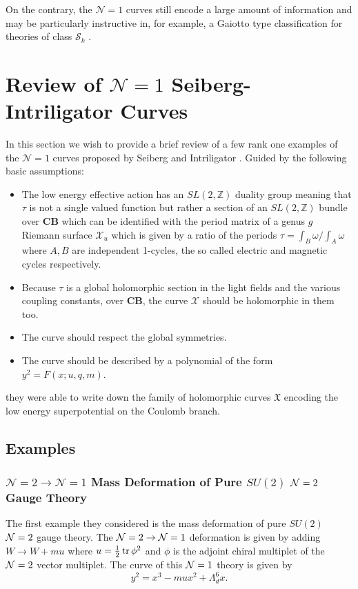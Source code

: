 \documentclass[main.tex]{subfiles}
\begin{document}
On the contrary, the $\mathcal{N}=1$ curves still encode a large amount of information and may be particularly instructive in, for example, a Gaiotto type classification for theories of class $\mathcal{S}_k$ \cite{Gaiotto:2009we,Gaiotto:2009hg}.

\section{Review of \texorpdfstring{$\mathcal{N}=1$}{N=1} Seiberg-Intriligator Curves}
In this section we wish to provide a brief review of a few rank one examples of the $\mathcal{N}=1$ curves proposed by Seiberg and Intriligator \cite{Intriligator:1994sm}. Guided by the following basic assumptions:
\begin{itemize}
 \item {The low energy effective action has an $SL(2,\mathbb{Z})$ duality group meaning that $\tau$ is not a single valued function but rather a section of an $SL(2,\mathbb{Z})$ bundle over $\mathbf{CB}$ which can be identified with the period matrix of a genus $g$ Riemann surface $\mathcal{X}_u$ which is given by a ratio of the periods $\tau=\int_{B}\omega/\int_{A}\omega$ where $A,B$ are independent 1-cycles, the so called electric and magnetic cycles respectively.}
 \item {Because $\tau$ is a global holomorphic section in the light fields and the various coupling constants, over $\mathbf{CB}$, the curve $\mathcal{X}$ should be holomorphic in them too.}
\item{The curve should respect the global symmetries.}
\item{The curve should be described by a polynomial of the form $y^2=F(x;u,q,m)$.}
\end{itemize}
they were able to write down the family of holomorphic curves $\mathfrak{X}$ encoding the low energy superpotential on the Coulomb branch.
\subsection{Examples}
\subsubsection{$\mathcal{N}=2\to\mathcal{N}=1$ Mass Deformation of Pure $SU(2)$ $\mathcal{N}=2$ Gauge Theory}
The first example they considered is the mass deformation of pure $SU(2)$ $\mathcal{N}=2$ gauge theory. The $\mathcal{N}=2\to\mathcal{N}=1$ deformation is given by adding $W\to W+mu$ where $u=\frac{1}{2}\operatorname{tr}\phi^2$ and $\phi$ is the adjoint chiral multiplet of the $\mathcal{N}=2$ vector multiplet. The curve of this $\mathcal{N}=1$ theory is given by
\begin{equation}
y^2=x^3-mux^2+\Lambda_d^6x.
\end{equation}
\end{document}

